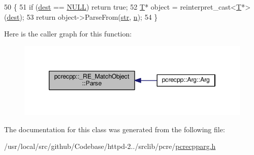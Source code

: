 \begin{DoxyCode}
50                                                                \{
51     \textcolor{keywordflow}{if} (\hyperlink{group__APACHE__CORE__DAEMON_gab3584b12c2335a84c3010a92e888124e}{dest} == \hyperlink{pcre_8txt_ad7f989d16aa8ca809a36bc392c07fba1}{NULL}) \textcolor{keywordflow}{return} \textcolor{keyword}{true};
52     \hyperlink{sljitNativeMIPS__common_8c_ae53008cb938e8e14ae47291e41be8bec}{T}* \textcolor{keywordtype}{object} = \textcolor{keyword}{reinterpret\_cast<}\hyperlink{sljitNativeMIPS__common_8c_ae53008cb938e8e14ae47291e41be8bec}{T}*\textcolor{keyword}{>}(\hyperlink{group__APACHE__CORE__DAEMON_gab3584b12c2335a84c3010a92e888124e}{dest});
53     \textcolor{keywordflow}{return} \textcolor{keywordtype}{object}->ParseFrom(\hyperlink{group__MOD__DAV_gaab9226fe8f632e1f998e24276d478f30}{str}, \hyperlink{group__APACHE__CORE__PROTO_gad484edfd58b9127caa8f0f59b4004d09}{n});
54   \}
\end{DoxyCode}


Here is the caller graph for this function\+:
\nopagebreak
\begin{figure}[H]
\begin{center}
\leavevmode
\includegraphics[width=346pt]{classpcrecpp_1_1__RE__MatchObject_ac81c9271d4b7bc810779306df0d279dc_icgraph}
\end{center}
\end{figure}




The documentation for this class was generated from the following file\+:\begin{DoxyCompactItemize}
\item 
/usr/local/src/github/\+Codebase/httpd-\/2../srclib/pcre/\hyperlink{pcrecpparg_8h}{pcrecpparg.\+h}\end{DoxyCompactItemize}
